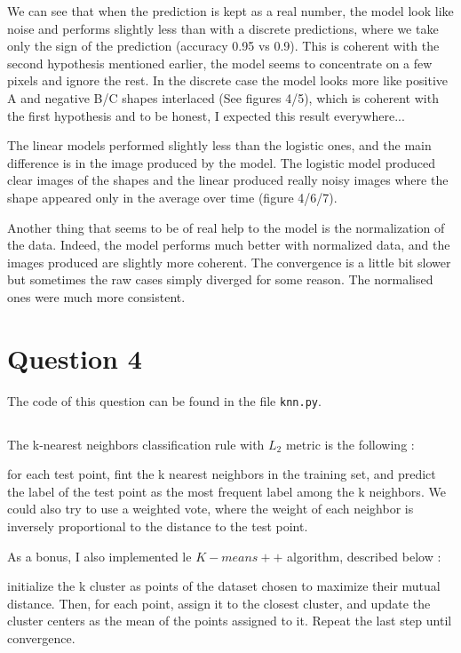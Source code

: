 \documentclass{article}
\begin{document}
We can see that when the prediction is kept as a real number, the model look like noise and performs slightly less than with a discrete predictions, where we take only the sign of the prediction (accuracy 0.95 vs 0.9).
This is coherent with the second hypothesis mentioned earlier, the model seems to concentrate on a few pixels and ignore the rest.
In the discrete case the model looks more like positive A and negative B/C shapes interlaced (See figures 4/5), which is coherent with the first hypothesis and to be honest, I expected this result everywhere...

The linear models performed slightly less than the logistic ones, and the main difference is in the image produced by the model. The logistic model produced clear images of the shapes and the linear produced really noisy images where the shape appeared only in the average over time (figure 4/6/7).

Another thing that seems to be of real help to the model is the normalization of the data. Indeed, the model performs much better with normalized data, and the images produced are slightly more coherent.
The convergence is a little bit slower but sometimes the raw cases simply diverged for some reason. The normalised ones were much more consistent.

\section{Question 4}

The code of this question can be found in the file \texttt{knn.py}.\newline

\subsection{}

The k-nearest neighbors classification rule with $L_2$ metric is the following :

for each test point, fint the k nearest neighbors in the training set, and predict the label of the test point as the most frequent label among the k neighbors.
We could also try to use a weighted vote, where the weight of each neighbor is inversely proportional to the distance to the test point.\newline

As a bonus, I also implemented le $K-means++$ algorithm, described below :

initialize the k cluster as points of the dataset chosen to maximize their mutual distance.
Then, for each point, assign it to the closest cluster, and update the cluster centers as the mean of the points assigned to it.
Repeat the last step until convergence.
\end{document}

